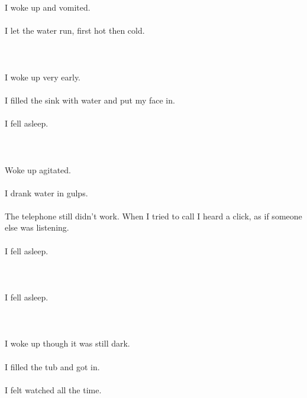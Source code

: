 \documentclass{article}
\begin{document}
    
    \section{}
    I woke up and vomited.\\\\I let the water run, first hot then cold.\\\\ 
    \newpage
    
    \section{}
    I woke up very early.\\\\I filled the sink with water and put my face in.\\\\I fell asleep.\\\\ 
    \newpage
    
    \section{}
    Woke up agitated.\\\\I drank water in gulps.\\\\The telephone still didn't work. When I tried to call I heard a click, as if someone else was listening.\\\\I fell asleep.\\\\ 
    \newpage
    
    \section{}
    I fell asleep.\\\\ 
    \newpage
    
    \section{}
    I woke up though it was still dark.\\\\I filled the tub and got in.\\\\I felt watched all the time.\\\\ 
    \newpage
    
\end{document}
